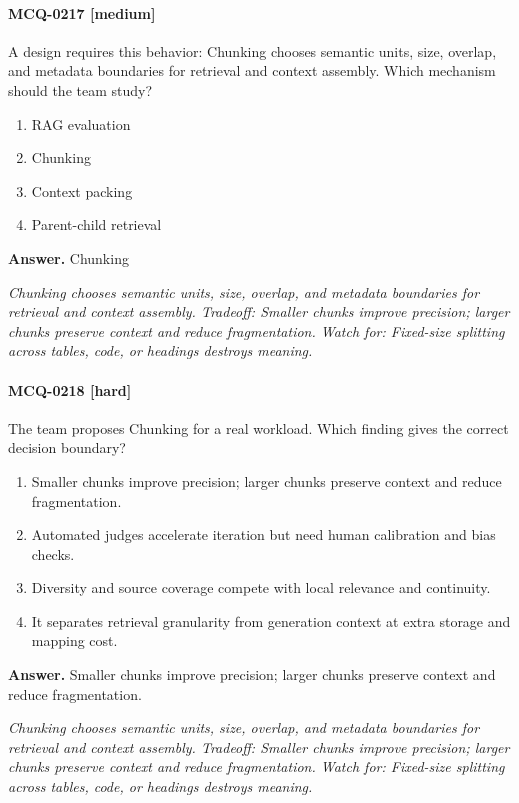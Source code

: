 \paragraph{MCQ-0217 [medium]} A design requires this behavior: Chunking chooses semantic units, size, overlap, and metadata boundaries for retrieval and context assembly. Which mechanism should the team study?
\begin{enumerate}[label=\Alph*.]
\item RAG evaluation
\item Chunking
\item Context packing
\item Parent-child retrieval
\end{enumerate}
\noindent\textbf{Answer.} Chunking
\par\textit{Chunking chooses semantic units, size, overlap, and metadata boundaries for retrieval and context assembly. Tradeoff: Smaller chunks improve precision; larger chunks preserve context and reduce fragmentation. Watch for: Fixed-size splitting across tables, code, or headings destroys meaning.}
\paragraph{MCQ-0218 [hard]} The team proposes Chunking for a real workload. Which finding gives the correct decision boundary?
\begin{enumerate}[label=\Alph*.]
\item Smaller chunks improve precision; larger chunks preserve context and reduce fragmentation.
\item Automated judges accelerate iteration but need human calibration and bias checks.
\item Diversity and source coverage compete with local relevance and continuity.
\item It separates retrieval granularity from generation context at extra storage and mapping cost.
\end{enumerate}
\noindent\textbf{Answer.} Smaller chunks improve precision; larger chunks preserve context and reduce fragmentation.
\par\textit{Chunking chooses semantic units, size, overlap, and metadata boundaries for retrieval and context assembly. Tradeoff: Smaller chunks improve precision; larger chunks preserve context and reduce fragmentation. Watch for: Fixed-size splitting across tables, code, or headings destroys meaning.}
